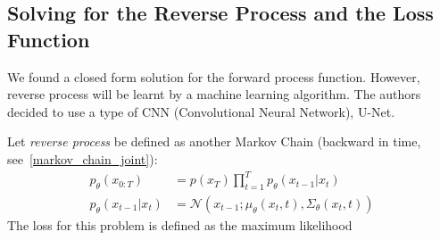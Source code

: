 \documentclass{article}
\numberwithin{equation}{subsection}
\begin{document}
\subsection{Solving for the Reverse Process and the Loss Function}


We found a closed form solution for the forward process function. However, reverse process will be learnt by a machine learning algorithm. The authors decided to use a type of CNN (Convolutional Neural Network), U-Net.

Let \textit{reverse process} be defined as another Markov Chain (backward in time, see~\ref{markov_chain_joint}):
\begin{align}
    p_\theta(x_{0:T}) &= p(x_T)\prod_{t=1}^T p_\theta(x_{t-1}|x_t)\\
    p_\theta(x_{t-1}|x_t) &= \mathcal{N}(x_{t-1}; \mu_\theta(x_t, t), \Sigma_\theta(x_t,t))
\end{align}
The loss for this problem is defined as the maximum likelihood
\end{document}
